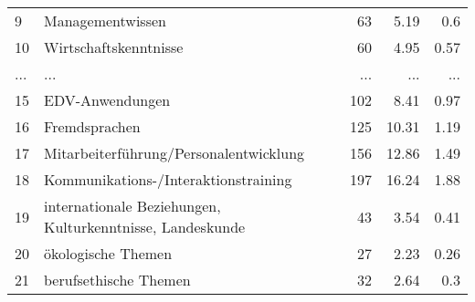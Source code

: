 \begin{longtable}{lXrrr}
        9 & \multicolumn{1}{X}{Managementwissen} & %
          \num{63} &
          \num[round-mode=places,round-precision=2]{5.19} &
          \num[round-mode=places,round-precision=2]{0.6} \\
        10 & \multicolumn{1}{X}{Wirtschaftskenntnisse} & %
          \num{60} &
          \num[round-mode=places,round-precision=2]{4.95} &
          \num[round-mode=places,round-precision=2]{0.57} \\
       ... & ... & ... & ... & ... \\
        15 & \multicolumn{1}{X}{EDV-Anwendungen} & %
          \num{102} &
          \num[round-mode=places,round-precision=2]{8.41} &
          \num[round-mode=places,round-precision=2]{0.97} \\

        16 & \multicolumn{1}{X}{Fremdsprachen} & %
          \num{125} &
          \num[round-mode=places,round-precision=2]{10.31} &
          \num[round-mode=places,round-precision=2]{1.19} \\

        17 & \multicolumn{1}{X}{Mitarbeiterführung/Personalentwicklung} & %
          \num{156} &
          \num[round-mode=places,round-precision=2]{12.86} &
          \num[round-mode=places,round-precision=2]{1.49} \\

        18 & \multicolumn{1}{X}{Kommunikations-/Interaktionstraining} & %
          \num{197} &
          \num[round-mode=places,round-precision=2]{16.24} &
          \num[round-mode=places,round-precision=2]{1.88} \\

        19 & \multicolumn{1}{X}{internationale Beziehungen, Kulturkenntnisse, Landeskunde} & %
          \num{43} &
          \num[round-mode=places,round-precision=2]{3.54} &
          \num[round-mode=places,round-precision=2]{0.41} \\

        20 & \multicolumn{1}{X}{ökologische Themen} & %
          \num{27} &
          \num[round-mode=places,round-precision=2]{2.23} &
          \num[round-mode=places,round-precision=2]{0.26} \\

        21 & \multicolumn{1}{X}{berufsethische Themen} & %
          \num{32} &
          \num[round-mode=places,round-precision=2]{2.64} &
          \num[round-mode=places,round-precision=2]{0.3} \\


\end{longtable}
